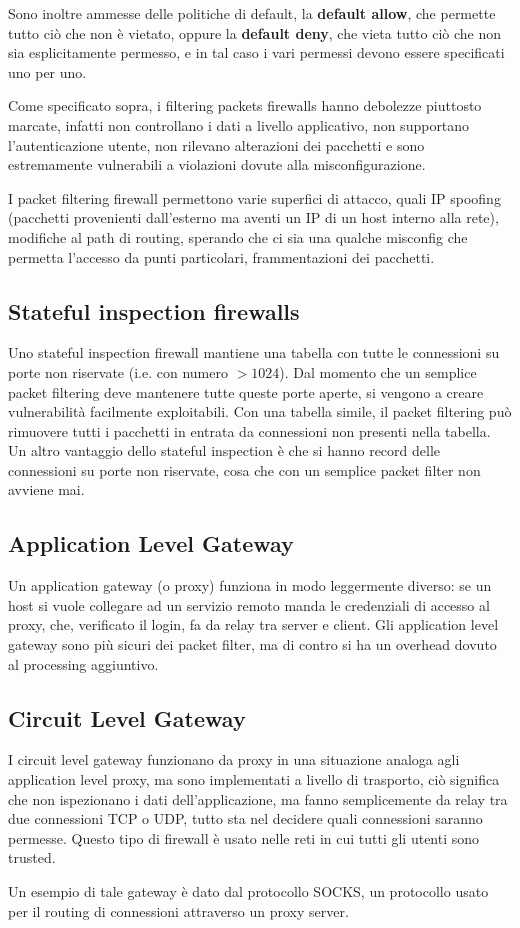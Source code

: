 \documentclass[a4paper, 10pt, twoside]{article}
\begin{document}
	Sono inoltre ammesse delle politiche di default, la \textbf{default allow}, che permette tutto ciò che non è vietato, oppure la \textbf{default deny}, che vieta tutto ciò che non sia esplicitamente permesso, e in tal caso i vari permessi devono essere specificati uno per uno.

	Come specificato sopra, i filtering packets firewalls hanno debolezze piuttosto marcate, infatti non controllano i dati a livello applicativo, non supportano l'autenticazione utente, non rilevano alterazioni dei pacchetti e sono estremamente vulnerabili a violazioni dovute alla misconfigurazione.

	I packet filtering firewall permettono varie superfici di attacco, quali IP spoofing (pacchetti provenienti dall'esterno ma aventi un IP di un host interno alla rete), modifiche al path di routing, sperando che ci sia una qualche misconfig che permetta l'accesso da punti particolari, frammentazioni dei pacchetti.

	\subsection{Stateful inspection firewalls}
	Uno stateful inspection firewall mantiene una tabella con tutte le connessioni su porte non riservate (i.e. con numero $ > 1024$). Dal momento che un semplice packet filtering deve mantenere tutte queste porte aperte, si vengono a creare vulnerabilità facilmente exploitabili. Con una tabella simile, il packet filtering può rimuovere tutti i pacchetti in entrata da connessioni non presenti nella tabella.
	Un altro vantaggio dello stateful inspection è che si hanno record delle connessioni su porte non riservate, cosa che con un semplice packet filter non avviene mai.

	\subsection{Application Level Gateway}
	Un application gateway (o proxy) funziona in modo leggermente diverso: se un host si vuole collegare ad un servizio remoto manda le credenziali di accesso al proxy, che, verificato il login, fa da relay tra server e client. Gli application level gateway sono più sicuri dei packet filter, ma di contro si ha un overhead dovuto al processing aggiuntivo.

	\subsection{Circuit Level Gateway}
	I circuit level gateway funzionano da proxy in una situazione analoga agli application level proxy, ma sono implementati a livello di trasporto, ciò significa che non ispezionano i dati dell'applicazione, ma fanno semplicemente da relay tra due connessioni TCP o UDP, tutto sta nel decidere quali connessioni saranno permesse. Questo tipo di firewall è usato nelle reti in cui tutti gli utenti sono trusted.

	Un esempio di tale gateway è dato dal protocollo SOCKS, un protocollo usato per il routing di connessioni attraverso un proxy server.
\end{document}
